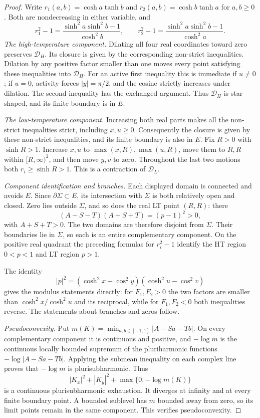 \documentclass[11pt]{article}
\numberwithin{equation}{section}
\theoremstyle{definition}
\begin{document}
\begin{proof}
Write $r_1(a,b)=\cosh a\tanh b$ and
$r_2(a,b)=\cosh b\tanh a$ for $a,b\geq0$.  Both are
nondecreasing in either variable, and
\[
 r_1^2-1=\frac{\sinh^2a\sinh^2b-1}{\cosh^2b},\qquad
 r_2^2-1=\frac{\sinh^2a\sinh^2b-1}{\cosh^2a}.
\]
\emph{The high-temperature component.}
Dilating all four real coordinates toward zero preserves
$\mathcal D_H$. Its closure is given by the corresponding non-strict
inequalities. Dilation by any positive factor smaller than one moves
every point satisfying these inequalities into $\mathcal D_H$. For an active first
inequality this is immediate if $u\ne0$; if $u=0$, activity
forces $|y|=\pi/2$, and the cosine strictly increases under
dilation.  The second inequality has the exchanged argument.
Thus $\mathcal D_H$ is star shaped, and its finite boundary is
in $E$.

\emph{The low-temperature component.}
Increasing both real parts makes all the non-strict inequalities
strict, including $x,u\geq0$. Consequently the closure is given
by these non-strict inequalities, and its finite
boundary is also in $E$.  Fix $R>0$ with $\sinh R>1$.
Increase $x,u$ to $\max(x,R),\max(u,R)$, move them to $R,R$
within $[R,\infty)^2$, and then move $y,v$ to zero.
Throughout the last two motions both $r_i\geq\sinh R>1$.
This is a contraction of $\mathcal D_L$.

\emph{Component identification and branches.}
Each displayed domain is connected and avoids $E$. Since
$\partial\Sigma\subset E$, its intersection with $\Sigma$
is both relatively open and closed.  Zero lies outside $\Sigma$,
and so does the real LT point $(R,R)$: there
\[
 (A-S-T)(A+S+T)=(p-1)^2>0,
\]
with $A+S+T>0$.  The two domains are therefore disjoint from
$\Sigma$.  Their boundaries lie in $\Sigma$, so each is an
entire complementary component.  On the positive real quadrant
the preceding formulas for $r_i^2-1$ identify the HT region
$0<p<1$ and LT region $p>1$.

The identity
\[
 |p|^2=(\cosh^2x-\cos^2y)(\cosh^2u-\cos^2v)
\]
gives the modulus statements directly: for $F_1,F_2>0$ the
two factors are smaller than $\cosh^2x/\cosh^2u$ and its
reciprocal, while for $F_1,F_2<0$ both inequalities reverse.
The statements about branches and zeros follow.

\emph{Pseudoconvexity.}
Put $m(K)=\min_{a,b\in[-1,1]}|A-Sa-Tb|$.
On every complementary component it is continuous and positive,
and $-\log m$ is the continuous locally bounded supremum of the
pluriharmonic functions $-\log|A-Sa-Tb|$.  Applying the submean
inequality on each complex line proves that $-\log m$ is
plurisubharmonic.  Thus
\[
 |K_x|^2+|K_y|^2+\max\{0,-\log m(K)\}
\]
is a continuous plurisubharmonic exhaustion.  It diverges at
infinity and at every finite boundary point.  A bounded sublevel
has $m$ bounded away from zero, so its limit points remain in
the same component.  This verifies pseudoconvexity.
\end{proof}
\end{document}
